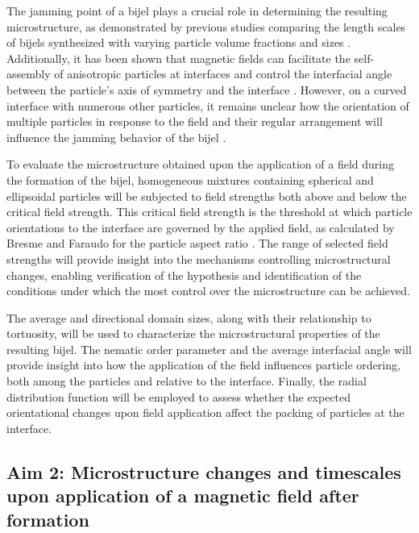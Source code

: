 The jamming point of a bijel plays a crucial role in determining the resulting microstructure, as demonstrated by previous studies comparing the length scales 
of bijels synthesized with varying particle volume fractions and sizes \cite{jansen_bijels_2011, reeves_particle-size_2015}. Additionally, it has been shown 
that magnetic fields can facilitate the self-assembly of anisotropic particles at interfaces and control the interfacial angle between the particle's axis 
of symmetry and the interface \cite{davies_interface_2014, davies_assembling_2014}. However, on a curved interface with numerous other particles, it remains 
unclear how the orientation of multiple particles in response to the field and their regular arrangement will influence the jamming behavior of the bijel 
\cite{bresme_orientational_2007, davies_interface_2014}.  

To evaluate the microstructure obtained upon the application of a field during the formation of the bijel, homogeneous mixtures containing spherical and 
ellipsoidal particles will be subjected to field strengths both above and below the critical field strength. This critical field strength is the threshold 
at which particle orientations to the interface are governed by the applied field, as calculated by Bresme and Faraudo for the particle aspect ratio 
\cite{bresme_orientational_2007, davies_interface_2014}. The range of selected field strengths will provide insight into the mechanisms controlling 
microstructural changes, enabling verification of the hypothesis and identification of the conditions under which the most control over the microstructure 
can be achieved.

The average and directional domain sizes, along with their relationship to tortuosity, will be used to characterize the microstructural properties of the 
resulting bijel. The nematic order parameter and the average interfacial angle will provide insight into how the application of the field influences particle 
ordering, both among the particles and relative to the interface. Finally, the radial distribution function will be employed to assess whether the expected 
orientational changes upon field application affect the packing of particles at the interface.

\subsection{Aim 2: Microstructure changes and timescales upon application of a magnetic field after formation}
\label{section:aim2_desc}

